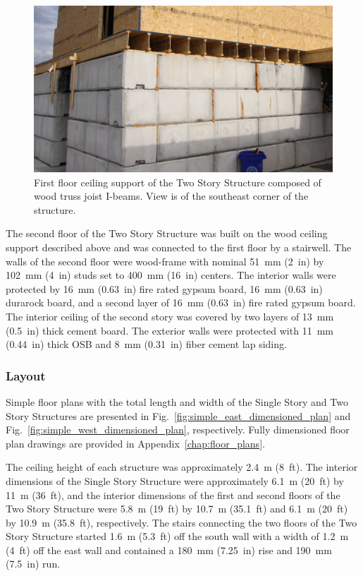 \documentclass[12pt,oneside]{book}
\begin{document}
\begin{figure}[!ht]
	\includegraphics[width=\columnwidth]{../Figures/Pictures/TJI_support}
	\caption[TJI-constructed ceiling support of the Two Story Structure.]{First floor ceiling support of the Two Story Structure composed of wood truss joist I-beams. View is of the southeast corner of the structure.}
	\label{fig:TJI}
\end{figure}
\FloatBarrier

The second floor of the Two Story Structure was built on the wood ceiling support described above and was connected to the first floor by a stairwell. The walls of the second floor were wood-frame with nominal 51~mm (2~in) by 102~mm (4~in) studs set to 400~mm (16~in) centers. The interior walls were protected by 16~mm (0.63~in) fire rated gypsum board, 16~mm (0.63~in) durarock board, and a second layer of 16~mm (0.63~in) fire rated gypsum board. The interior ceiling of the second story was covered by two layers of 13~mm (0.5~in) thick cement board. The exterior walls were protected with 11~mm (0.44~in) thick OSB and 8~mm (0.31~in) fiber cement lap siding.

\subsubsection{Layout}
\label{sec:layout}
Simple floor plans with the total length and width of the Single Story and Two Story Structures are presented in Fig.~\ref{fig:simple_east_dimensioned_plan} and Fig.~\ref{fig:simple_west_dimensioned_plan}, respectively. Fully dimensioned floor plan drawings are provided in Appendix~\ref{chap:floor_plans}.

The ceiling height of each structure was approximately 2.4~m (8~ft). The interior dimensions of the Single Story Structure were approximately 6.1~m (20~ft) by 11~m (36~ft), and the interior dimensions of the first and second floors of the Two Story Structure were 5.8~m (19~ft) by 10.7~m (35.1~ft) and 6.1~m (20~ft) by 10.9~m (35.8~ft), respectively. The stairs connecting the two floors of the Two Story Structure started 1.6~m (5.3~ft) off the south wall with a width of 1.2~m (4~ft) off the east wall and contained a 180~mm (7.25~in) rise and 190~mm (7.5~in) run.
\end{document}

